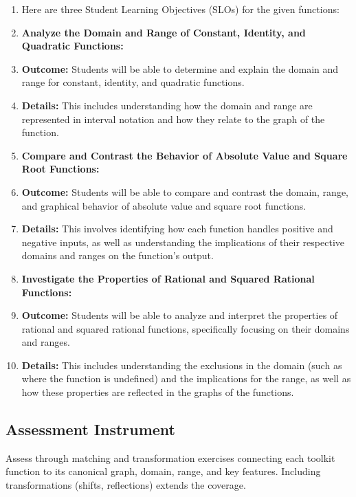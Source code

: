 \begin{enumerate}
    \item Here are three Student Learning Objectives (SLOs) for the given functions:
    \item \textbf{Analyze the Domain and Range of Constant, Identity, and Quadratic Functions:}
    \item \textbf{Outcome:} Students will be able to determine and explain the domain and range for constant, identity, and quadratic functions.
    \item \textbf{Details:} This includes understanding how the domain and range are represented in interval notation and how they relate to the graph of the function.
    \item \textbf{Compare and Contrast the Behavior of Absolute Value and Square Root Functions:}
    \item \textbf{Outcome:} Students will be able to compare and contrast the domain, range, and graphical behavior of absolute value and square root functions.
    \item \textbf{Details:} This involves identifying how each function handles positive and negative inputs, as well as understanding the implications of their respective domains and ranges on the function's output.
    \item \textbf{Investigate the Properties of Rational and Squared Rational Functions:}
    \item \textbf{Outcome:} Students will be able to analyze and interpret the properties of rational and squared rational functions, specifically focusing on their domains and ranges.
    \item \textbf{Details:} This includes understanding the exclusions in the domain (such as where the function is undefined) and the implications for the range, as well as how these properties are reflected in the graphs of the functions.
\end{enumerate}


\subsection{Assessment Instrument}
\label{ssec:asse-3669}


Assess through matching and transformation exercises connecting each
toolkit function to its canonical graph, domain, range, and key features.
Including transformations (shifts, reflections) extends the coverage.


